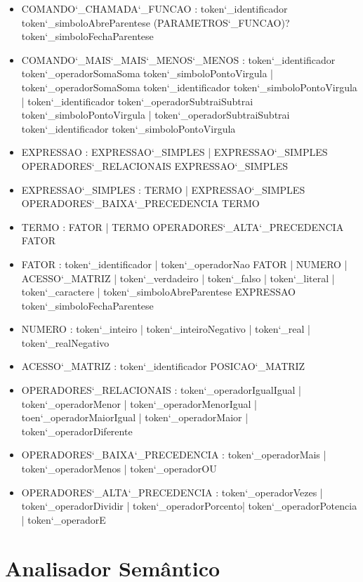 \documentclass[
12pt,				%
a4paper,			%
english,			%
french,				%
spanish,			%
brazil,				%
article
]{abntex2}
\begin{document}
\begin{itemize}
	\item COMANDO\char`_CHAMADA\char`_FUNCAO : token\char`_identificador token\char`_simboloAbreParentese (PARAMETROS\char`_FUNCAO)? token\char`_simboloFechaParentese
	\item COMANDO\char`_MAIS\char`_MAIS\char`_MENOS\char`_MENOS : token\char`_identificador token\char`_operadorSomaSoma token\char`_simboloPontoVirgula |  token\char`_operadorSomaSoma token\char`_identificador token\char`_simboloPontoVirgula | token\char`_identificador token\char`_operadorSubtraiSubtrai token\char`_simboloPontoVirgula | token\char`_operadorSubtraiSubtrai token\char`_identificador token\char`_simboloPontoVirgula
	\item EXPRESSAO : EXPRESSAO\char`_SIMPLES | EXPRESSAO\char`_SIMPLES OPERADORES\char`_RELACIONAIS EXPRESSAO\char`_SIMPLES
	\item EXPRESSAO\char`_SIMPLES : TERMO | EXPRESSAO\char`_SIMPLES OPERADORES\char`_BAIXA\char`_PRECEDENCIA TERMO
	\item TERMO : FATOR | TERMO OPERADORES\char`_ALTA\char`_PRECEDENCIA FATOR
	\item FATOR : token\char`_identificador | token\char`_operadorNao FATOR | NUMERO | ACESSO\char`_MATRIZ | token\char`_verdadeiro | token\char`_falso | token\char`_literal | token\char`_caractere | token\char`_simboloAbreParentese EXPRESSAO token\char`_simboloFechaParentese
	\item NUMERO : token\char`_inteiro | token\char`_inteiroNegativo | token\char`_real | token\char`_realNegativo
	\item ACESSO\char`_MATRIZ : token\char`_identificador POSICAO\char`_MATRIZ
	\item OPERADORES\char`_RELACIONAIS : token\char`_operadorIgualIgual | token\char`_operadorMenor | token\char`_operadorMenorIgual | toen\char`_operadorMaiorIgual | token\char`_operadorMaior | token\char`_operadorDiferente
	\item OPERADORES\char`_BAIXA\char`_PRECEDENCIA : token\char`_operadorMais | token\char`_operadorMenos | token\char`_operadorOU
	\item OPERADORES\char`_ALTA\char`_PRECEDENCIA : token\char`_operadorVezes | token\char`_operadorDividir | token\char`_operadorPorcento| token\char`_operadorPotencia | token\char`_operadorE
\end{itemize}


\section{Analisador Semântico}
\end{document}
